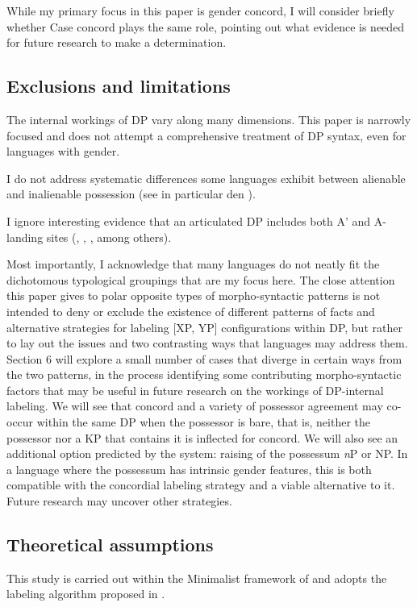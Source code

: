 \documentclass[output=paper
,modfonts
,nonflat]{langsci/langscibook}
\begin{document}
While my primary focus in this paper is gender concord, I will consider briefly whether Case concord plays the same role, pointing out what evidence is needed for future research to make a determination.

\subsection{Exclusions and limitations}
The internal workings of DP vary along many dimensions. This paper is narrowly focused and does not attempt a comprehensive treatment of DP syntax, even for languages with gender.

I do not address systematic differences some languages exhibit between alienable and inalienable possession (see in particular den \citealt{Dikken2015}).     

I ignore interesting evidence that an articulated DP includes both A' and A-landing sites (\citealt{Szabolsci1983}, \citealt{Gavruseva2000}, \citealt{Alexiadou2001}, \citealt{Haegeman2004b} among others).    

Most importantly, I acknowledge that many languages do not neatly fit the dichotomous typological groupings that are my focus here. The close attention this paper gives to polar opposite types of morpho-syntactic patterns is not intended to deny or exclude the existence of different patterns of facts and alternative strategies for labeling [XP, YP] configurations within DP, but rather to lay out the issues and two contrasting ways that languages may address them. Section 6 will explore a small number of cases that diverge in certain ways from the two patterns, in the process identifying some contributing morpho-syntactic factors that may be useful in future research on the workings of DP-internal labeling. We will see that concord and a variety of possessor agreement may co-occur within the same DP when the possessor is bare, that is, neither the possessor nor a KP that contains it is inflected for concord. We will also see an additional option predicted by the system: raising of the possessum \textit{n}P or NP. In a language where the possessum has intrinsic gender features, this is both compatible with the concordial labeling strategy and a viable alternative to it. Future research may uncover other strategies.    

\subsection{Theoretical assumptions}
This study is carried out within the Minimalist framework of \citet{Chomsky2000, Chomsky2001} and adopts the labeling algorithm proposed in \citet{Chomsky2013, Chomsky2015}. 
\end{document}
